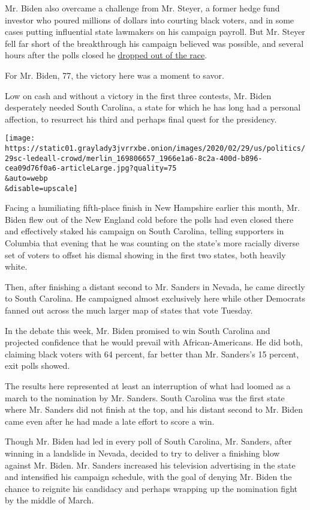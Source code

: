 Mr. Biden also overcame a challenge from Mr. Steyer, a former hedge fund
investor who poured millions of dollars into courting black voters, and
in some cases putting influential state lawmakers on his campaign
payroll. But Mr. Steyer fell far short of the breakthrough his campaign
believed was possible, and several hours after the polls closed he
\href{https://www.nytimes3xbfgragh.onion/2020/02/29/us/politics/tom-steyer-drops-out.html}{dropped
out of the race}.

For Mr. Biden, 77, the victory here was a moment to savor.

Low on cash and without a victory in the first three contests, Mr. Biden
desperately needed South Carolina, a state for which he has long had a
personal affection, to resurrect his third and perhaps final quest for
the presidency.

\texttt{[image: https://static01.graylady3jvrrxbe.onion/images/2020/02/29/us/politics/29sc-ledeall-crowd/merlin\_169806657\_1966e1a6-8c2a-400d-b896-cea09d76f0a6-articleLarge.jpg?quality=75\\\&auto=webp\\\&disable=upscale]}

Facing a humiliating fifth-place finish in New Hampshire earlier this
month, Mr. Biden flew out of the New England cold before the polls had
even closed there and effectively staked his campaign on South Carolina,
telling supporters in Columbia that evening that he was counting on the
state's more racially diverse set of voters to offset his dismal showing
in the first two states, both heavily white.

Then, after finishing a distant second to Mr. Sanders in Nevada, he came
directly to South Carolina. He campaigned almost exclusively here while
other Democrats fanned out across the much larger map of states that
vote Tuesday.

In the debate this week, Mr. Biden promised to win South Carolina and
projected confidence that he would prevail with African-Americans. He
did both, claiming black voters with 64 percent, far better than Mr.
Sanders's 15 percent, exit polls showed.

The results here represented at least an interruption of what had loomed
as a march to the nomination by Mr. Sanders. South Carolina was the
first state where Mr. Sanders did not finish at the top, and his distant
second to Mr. Biden came even after he had made a late effort to score a
win.

Though Mr. Biden had led in every poll of South Carolina, Mr. Sanders,
after winning in a landslide in Nevada, decided to try to deliver a
finishing blow against Mr. Biden. Mr. Sanders increased his television
advertising in the state and intensified his campaign schedule, with the
goal of denying Mr. Biden the chance to reignite his candidacy and
perhaps wrapping up the nomination fight by the middle of March.

